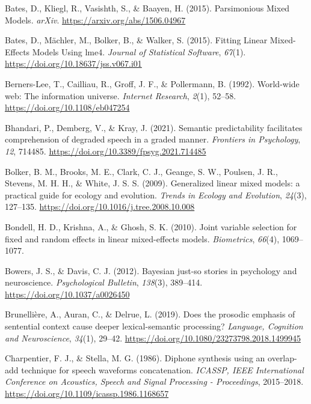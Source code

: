 \documentclass[a4paper, nobind]{templates/ociamthesis}
\newlength{\cslhangindent}
\newenvironment{CSLReferences}[2] %
 {%
  \setlength{\parindent}{0pt}
  \ifodd #1
  \let\oldpar\par
  \def\par{\hangindent=\cslhangindent\oldpar}
  \fi
  \setlength{\parskip}{1mm}
  \setlength{\baselineskip}{6mm}
 }%
 {}
\begin{document}
\begin{CSLReferences}{1}{0}
\leavevmode{}%
Bates, D., Kliegl, R., Vasishth, S., \& Baayen, H. (2015). {Parsimonious Mixed Models}. \emph{arXiv}. \url{https://arxiv.org/abs/1506.04967}

\leavevmode{}%
Bates, D., Mächler, M., Bolker, B., \& Walker, S. (2015). Fitting Linear Mixed-Effects Models Using lme4. \emph{Journal of Statistical Software}, \emph{67}(1). \url{https://doi.org/10.18637/jss.v067.i01}

\leavevmode{}%
Berners-Lee, T., Cailliau, R., Groff, J. F., \& Pollermann, B. (1992). {World-wide web: The information universe}. \emph{Internet Research}, \emph{2}(1), 52--58. \url{https://doi.org/10.1108/eb047254}

\leavevmode{}%
Bhandari, P., Demberg, V., \& Kray, J. (2021). {Semantic predictability facilitates comprehension of degraded speech in a graded manner}. \emph{Frontiers in Psychology}, \emph{12}, 714485. \url{https://doi.org/10.3389/fpsyg.2021.714485}

\leavevmode{}%
Bolker, B. M., Brooks, M. E., Clark, C. J., Geange, S. W., Poulsen, J. R., Stevens, M. H. H., \& White, J. S. S. (2009). {Generalized linear mixed models: a practical guide for ecology and evolution}. \emph{Trends in Ecology and Evolution}, \emph{24}(3), 127--135. \url{https://doi.org/10.1016/j.tree.2008.10.008}

\leavevmode{}%
Bondell, H. D., Krishna, A., \& Ghosh, S. K. (2010). Joint variable selection for fixed and random effects in linear mixed-effects models. \emph{Biometrics}, \emph{66}(4), 1069--1077.

\leavevmode{}%
Bowers, J. S., \& Davis, C. J. (2012). {Bayesian just-so stories in psychology and neuroscience}. \emph{Psychological Bulletin}, \emph{138}(3), 389--414. \url{https://doi.org/10.1037/a0026450}

\leavevmode{}%
Brunellière, A., Auran, C., \& Delrue, L. (2019). {Does the prosodic emphasis of sentential context cause deeper lexical-semantic processing?} \emph{Language, Cognition and Neuroscience}, \emph{34}(1), 29--42. \url{https://doi.org/10.1080/23273798.2018.1499945}

\leavevmode{}%
Charpentier, F. J., \& Stella, M. G. (1986). {Diphone synthesis using an overlap-add technique for speech waveforms concatenation.} \emph{ICASSP, IEEE International Conference on Acoustics, Speech and Signal Processing - Proceedings}, 2015--2018. \url{https://doi.org/10.1109/icassp.1986.1168657}


\end{CSLReferences}
\end{document}
